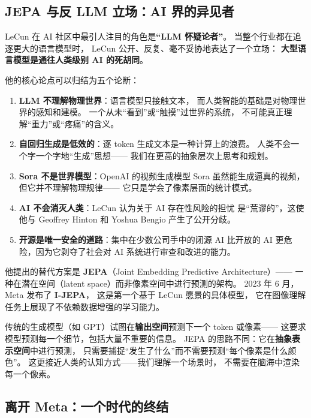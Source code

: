 \subsection{JEPA 与反 LLM 立场：AI 界的异见者}

LeCun 在 AI 社区中最引人注目的角色是\textbf{``LLM 怀疑论者''}。
当整个行业都在追逐更大的语言模型时，
LeCun 公开、反复、毫不妥协地表达了一个立场：
\textbf{大型语言模型是通往人类级别 AI 的死胡同}。

他的核心论点可以归结为五个论断：

\begin{enumerate}
  \item \textbf{LLM 不理解物理世界}：语言模型只接触文本，
    而人类智能的基础是对物理世界的感知和建模。
    一个从未``看到''或``触摸''过世界的系统，
    不可能真正理解``重力''或``疼痛''的含义。
  \item \textbf{自回归生成是低效的}：逐 token 生成文本是一种计算上的浪费。
    人类不会一个字一个字地``生成''思想——
    我们在更高的抽象层次上思考和规划。
  \item \textbf{Sora 不是世界模型}：OpenAI 的视频生成模型 Sora
    虽然能生成逼真的视频，但它并不理解物理规律——
    它只是学会了像素层面的统计模式。
  \item \textbf{AI 不会消灭人类}：LeCun 认为关于 AI 存在性风险的担忧
    是``荒谬的''，这使他与 Geoffrey Hinton 和 Yoshua Bengio 产生了公开分歧。
  \item \textbf{开源是唯一安全的道路}：集中在少数公司手中的闭源 AI
    比开放的 AI 更危险，因为它剥夺了社会对 AI 系统进行审查和改进的能力。
\end{enumerate}

他提出的替代方案是 \textbf{JEPA}（Joint Embedding Predictive Architecture）——
一种在潜在空间（latent space）而非像素空间中进行预测的架构。
2023 年 6 月，Meta 发布了 \textbf{I-JEPA}，
这是第一个基于 LeCun 愿景的具体模型，
它在图像理解任务上展现了不依赖数据增强的学习能力。

\begin{keybox}
传统的生成模型（如 GPT）试图在\textbf{输出空间}预测下一个 token 或像素——
这要求模型预测每一个细节，包括大量不重要的信息。
JEPA 的思路不同：它在\textbf{抽象表示空间}中进行预测，
只需要捕捉``发生了什么''而不需要预测``每个像素是什么颜色''。
这更接近人类的认知方式——我们理解一个场景时，
不需要在脑海中渲染每一个像素。
\end{keybox}

\subsection{离开 Meta：一个时代的终结}

